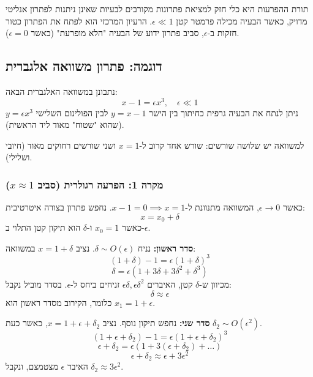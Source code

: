 תורת ההפרעות היא כלי חזק למציאת פתרונות מקורבים לבעיות שאינן ניתנות לפתרון אנליטי מדויק, כאשר הבעיה מכילה פרמטר קטן $\epsilon \ll 1$. הרעיון המרכזי הוא לפתח את הפתרון כטור חזקות ב-$\epsilon$, סביב פתרון ידוע של הבעיה "הלא מופרעת" (כאשר $\epsilon=0$).

\subsection{דוגמה: פתרון משוואה אלגברית}
נתבונן במשוואה האלגברית הבאה:
\[
x - 1 = \epsilon x^3, \quad \epsilon \ll 1
\]
ניתן לנתח את הבעיה גרפית כחיתוך בין הישר $y=x-1$ לבין הפולינום השלישי $y=\epsilon x^3$ (שהוא "שטוח" מאוד ליד הראשית).
\begin{center}
\end{center}
למשוואה יש שלושה שורשים: שורש אחד קרוב ל-$x=1$ ושני שורשים רחוקים מאוד (חיובי ושלילי).

\subsubsection{מקרה 1: הפרעה רגולרית (סביב $x \approx 1$)}
כאשר $\epsilon \to 0$, המשוואה מתנוונת ל-$x-1=0 \implies x=1$.
נחפש פתרון בצורה איטרטיבית:
\[
x = x_0 + \delta
\]
כאשר $x_0=1$ ו-$\delta$ הוא תיקון קטן התלוי ב-$\epsilon$.

\textbf{סדר ראשון:}
נניח $\delta \sim O(\epsilon)$. נציב $x=1+\delta$ במשוואה:
\[
(1+\delta) - 1 = \epsilon (1+\delta)^3
\]
\[
\delta = \epsilon (1 + 3\delta + 3\delta^2 + \delta^3)
\]
מכיוון ש-$\delta$ קטן, האיברים $\epsilon \delta, \epsilon \delta^2$ זניחים ביחס ל-$\epsilon$. בסדר מוביל נקבל:
\[
\delta \approx \epsilon
\]
כלומר, הקירוב מסדר ראשון הוא $x_1 = 1 + \epsilon$.

\textbf{סדר שני:}
נחפש תיקון נוסף. נציב $x = 1 + \epsilon + \delta_2$, כאשר כעת $\delta_2 \sim O(\epsilon^2)$.
\[
(1 + \epsilon + \delta_2) - 1 = \epsilon (1 + \epsilon + \delta_2)^3
\]
\[
\epsilon + \delta_2 = \epsilon (1 + 3(\epsilon+\delta_2) + \dots)
\]
\[
\epsilon + \delta_2 \approx \epsilon + 3\epsilon^2
\]
האיבר $\epsilon$ מצטמצם, ונקבל $\delta_2 \approx 3\epsilon^2$.

